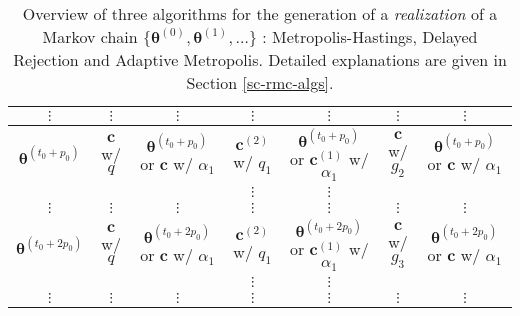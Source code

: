 \begin{sidewaystable}[h]
\begin{tabular}{|c||c|c||c|c||c|c|}
\hline
\hline
$\vdots$             & $\vdots$                & $\vdots$                                & $\vdots$               & $\vdots$                                        & $\vdots$         & $\vdots$                                \\
\hline
\hline
$\boldsymbol{\theta}^{(t_0+p_0)}$ & $\mathbf{c}$ w/ $q$              & $\boldsymbol{\theta}^{(t_0+p_0)}$ or $\mathbf{c}$ w/ $\alpha_1$ & $\mathbf{c}^{(2)}$ w/ $q_1$     & $\boldsymbol{\theta}^{(t_0+p_0)}$ or $\mathbf{c}^{(1)}$ w/ $\alpha_1$ & $\mathbf{c}$ w/ $g_2$     & $\boldsymbol{\theta}^{(t_0+p_0)}$ or $\mathbf{c}$ w/ $\alpha_1$ \\
\cline{4-5}
                     &                         &                                         & $\vdots$               & $\vdots$                                        &                  &                                         \\
\hline
\hline
$\vdots$             & $\vdots$                & $\vdots$                                & $\vdots$               & $\vdots$                                        & $\vdots$         & $\vdots$                                \\
\hline
\hline
$\boldsymbol{\theta}^{(t_0+2p_0)}$& $\mathbf{c}$ w/ $q$              & $\boldsymbol{\theta}^{(t_0+2p_0)}$ or $\mathbf{c}$ w/ $\alpha_1$& $\mathbf{c}^{(2)}$ w/ $q_1$     & $\boldsymbol{\theta}^{(t_0+2p_0)}$ or $\mathbf{c}^{(1)}$ w/ $\alpha_1$& $\mathbf{c}$ w/ $g_3$     & $\boldsymbol{\theta}^{(t_0+2p_0)}$ or $\mathbf{c}$ w/ $\alpha_1$\\
\cline{4-5}
                     &                         &                                         & $\vdots$               & $\vdots$                                        &                  &                                         \\
\hline
\hline
$\vdots$             & $\vdots$                & $\vdots$                                & $\vdots$               & $\vdots$                                        & $\vdots$         & $\vdots$                                \\
\hline
\end{tabular}
\caption{Overview of three algorithms for the generation of a {\it realization} of a Markov chain 
$\{\boldsymbol{\theta}^{(0)},\boldsymbol{\theta}^{(1)},\ldots\}$
: Metropolis-Hastings, Delayed Rejection and Adaptive Metropolis.
Detailed explanations are given in Section \ref{sc-rmc-algs}.
}
\label{tab-dram}
\end{sidewaystable}

